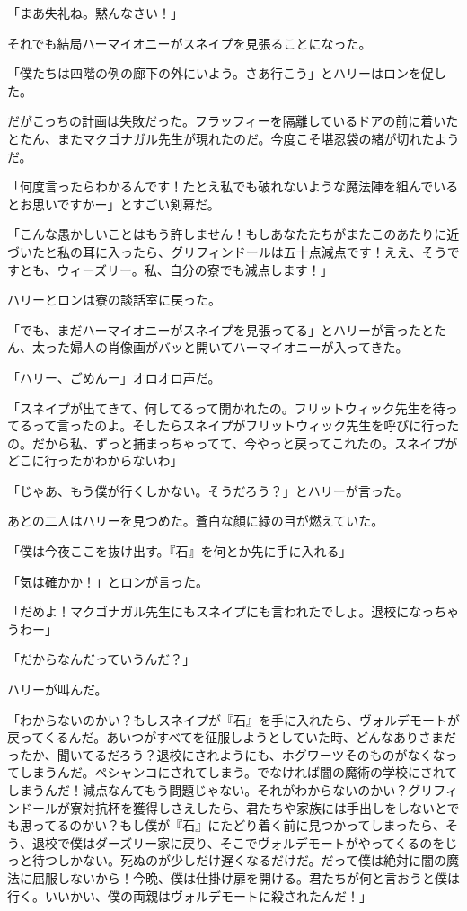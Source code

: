 \documentclass[10pt,a4paper]{article}
\begin{document}
\begin{CJK}{UTF8}{min}
「まあ失礼ね。黙んなさい！」

それでも結局ハーマイオニーがスネイプを見張ることになった。

「僕たちは四階の例の廊下の外にいよう。さあ行こう」とハリーはロンを促した。

だがこっちの計画は失敗だった。フラッフィーを隔離しているドアの前に着いたとたん、またマクゴナガル先生が現れたのだ。今度こそ堪忍袋の緒が切れたようだ。

「何度言ったらわかるんです！たとえ私でも破れないような魔法陣を組んでいるとお思いですかー」とすごい剣幕だ。

「こんな愚かしいことはもう許しません！もしあなたたちがまたこのあたりに近づいたと私の耳に入ったら、グリフィンドールは五十点減点です！ええ、そうですとも、ウィーズリー。私、自分の寮でも減点します！」

ハリーとロンは寮の談話室に戻った。

「でも、まだハーマイオニーがスネイプを見張ってる」とハリーが言ったとたん、太った婦人の肖像画がバッと開いてハーマイオニーが入ってきた。

「ハリー、ごめんー」オロオロ声だ。

「スネイプが出てきて、何してるって開かれたの。フリットウィック先生を待ってるって言ったのよ。そしたらスネイプがフリットウィック先生を呼びに行ったの。だから私、ずっと捕まっちゃってて、今やっと戻ってこれたの。スネイプがどこに行ったかわからないわ」

「じゃあ、もう僕が行くしかない。そうだろう？」とハリーが言った。

あとの二人はハリーを見つめた。蒼白な顔に緑の目が燃えていた。

「僕は今夜ここを抜け出す。『石』を何とか先に手に入れる」

「気は確かか！」とロンが言った。

「だめよ！マクゴナガル先生にもスネイプにも言われたでしょ。退校になっちゃうわー」

「だからなんだっていうんだ？」

ハリーが叫んだ。

「わからないのかい？もしスネイプが『石』を手に入れたら、ヴォルデモートが戻ってくるんだ。あいつがすべてを征服しようとしていた時、どんなありさまだったか、聞いてるだろう？退校にされようにも、ホグワーツそのものがなくなってしまうんだ。ペシャンコにされてしまう。でなければ闇の魔術の学校にされてしまうんだ！減点なんてもう問題じゃない。それがわからないのかい？グリフィンドールが寮対抗杯を獲得しさえしたら、君たちや家族には手出しをしないとでも思ってるのかい？もし僕が『石』にたどり着く前に見つかってしまったら、そう、退校で僕はダーズリー家に戻り、そこでヴォルデモートがやってくるのをじっと待つしかない。死ぬのが少しだけ遅くなるだけだ。だって僕は絶対に闇の魔法に屈服しないから！今晩、僕は仕掛け扉を開ける。君たちが何と言おうと僕は行く。いいかい、僕の両親はヴォルデモートに殺されたんだ！」


\end{CJK}
\end{document}
